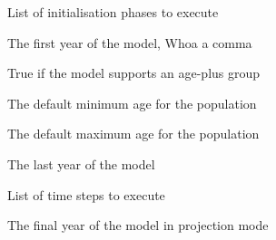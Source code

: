 
 {List of initialisation phases to execute}

 {The first year of the model, Whoa a comma}

 {True if the model supports an age-plus group}

 {The default minimum age for the population}

 {The default maximum age for the population}

 {The last year of the model}

 {List of time steps to execute}

 {The final year of the model in projection mode}

